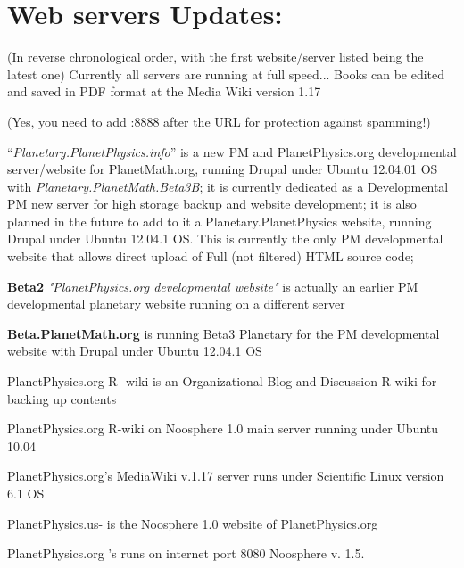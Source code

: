 \documentclass[12pt]{article}
\begin{document}
\section{Web servers Updates:}
(In reverse chronological order, with the first website/server listed being the latest one)
Currently all servers are running at full speed...
Books can be edited and saved in PDF format at the Media Wiki version 1.17

(Yes, you need to add :8888 after the URL for protection against spamming!)

 
 ``{\em Planetary.PlanetPhysics.info}'' is a new PM and PlanetPhysics.org developmental server/website for PlanetMath.org, running Drupal under Ubuntu 12.04.01 OS with {\em Planetary.PlanetMath.Beta3B}; it is currently dedicated as a Developmental PM new server for high storage backup and website development; it is also planned in the future to add to it a Planetary.PlanetPhysics website, running Drupal under Ubuntu 12.04.1 OS. This is currently the only PM developmental website that allows direct upload of Full (not filtered) HTML source code;

 {\bf Beta2} {\em "PlanetPhysics.org developmental website"} is actually an earlier PM developmental planetary website running on a different server

 {\bf Beta.PlanetMath.org} is running Beta3 Planetary for the PM developmental website with Drupal under Ubuntu 12.04.1 OS

 PlanetPhysics.org R- wiki is an Organizational Blog and Discussion R-wiki for backing up contents

 PlanetPhysics.org R-wiki on Noosphere 1.0 main server running under Ubuntu 10.04 

 PlanetPhysics.org's MediaWiki v.1.17 server runs under Scientific Linux version 6.1 OS 
 
 PlanetPhysics.us- is the Noosphere 1.0 website of PlanetPhysics.org

 PlanetPhysics.org 's  runs on internet port 8080 Noosphere v. 1.5. 
\end{document}
